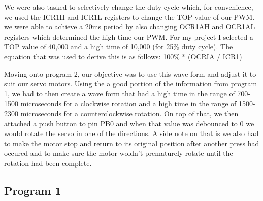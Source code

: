 \documentclass[11pt,pdftex,portrait,letterpaper]{article}
\begin{document}
	We were also tasked to selectively change the duty cycle which, for convenience, we used the ICR1H and ICR1L registers to change the TOP value of our PWM. we were able to achieve a 20ms period by also changing OCR1AH and OCR1AL registers which determined the high time our PWM. For my project I selected a TOP value of 40,000 and a high time of 10,000 (for 25\% duty cycle). The equation that was used to derive this is as follows:		100\% * (OCRIA / ICR1)
	
	Moving onto program 2, our objective was to use this wave form and adjust it to suit our servo motors. Using the a good portion of the information from program 1, we had to then create a wave form that had a high time in the range of 700-1500 microseconds for a clockwise rotation and a high time in the range of 1500-2300 microseconds for a counterclockwise rotation. On top of that, we then attached a push button to pin PB0 and when that value was debounced to 0 we would rotate the servo in one of the directions. A side note on that is we also had to make the motor stop and return to its original position after another press had occured and to make sure the motor woldn't prematurely rotate until the rotation had been complete.
	
	
		
	\subsection{Program 1}
	
\end{document}
